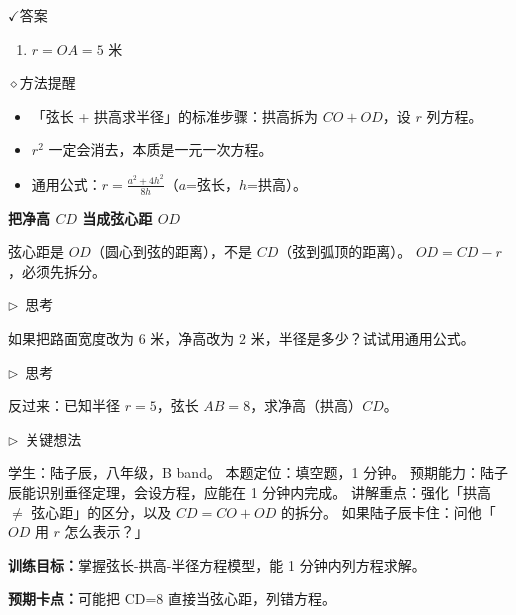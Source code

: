 \documentclass{exam-zh}
\newcommand{\edukai}{\kaishu}
\newcommand{\eduSubTitle}[1]{%
  \needspace{4\baselineskip}%
  \vspace{1mm}
  {\color{edu-blue}\bfseries #1}\par
  \vspace{1mm}
}
\newenvironment{eduAuxItem}[1]{%
  \needspace{4\baselineskip}%
  \vspace{2mm}
  \par\noindent
  \hangindent=8mm\hangafter=1
  {\color{edu-blue}\edukai $\triangleright$~#1}\enspace
  \begingroup
  \color{edu-ink}
  \edukai
}{%
  \endgroup
  \par
  \vspace{4mm}
}
\newcommand{\eduIconCheck}{\(\checkmark\)}
\newcommand{\eduIconPin}{\(\diamond\)}
\newenvironment{eduBulletList}{%
  \begin{itemize}[
    label=\textbullet,
    leftmargin=5mm,
    itemsep=1.2mm,
    topsep=0pt,
    parsep=0pt
  ]
}{%
  \end{itemize}
}
\newenvironment{eduBottomGrid}{%
  \vspace{1mm}
  \par\noindent
}{%
  \par\vspace{1mm}
}
\newenvironment{eduSummaryLeft}{%
  \begin{minipage}[t]{0.30\linewidth}
}{%
  \end{minipage}
}
\newcommand{\eduSummaryDivider}{%
  \hspace{4mm}{\color{edu-line}\vrule width 0.35pt}\hspace{7mm}%
}
\newenvironment{eduSummaryRight}{%
  \begin{minipage}[t]{0.58\linewidth}
}{%
  \end{minipage}
}
\newenvironment{eduPlainList}{%
  \begin{enumerate}[
    label=(\arabic*),
    leftmargin=7mm,
    itemsep=1.2mm,
    topsep=0pt,
    parsep=0pt
  ]
}{%
  \end{enumerate}
}
\begin{document}
\begin{eduBottomGrid}
  \begin{eduSummaryLeft}
    \begin{eduSummaryBlock}{\eduIconCheck}{答案}
    \begin{eduPlainList}
      \item $r = OA = 5$ 米    \end{eduPlainList}
    \end{eduSummaryBlock}
  \end{eduSummaryLeft}
  \eduSummaryDivider
  \begin{eduSummaryRight}
    \begin{eduSummaryBlock}{\eduIconPin}{方法提醒}
    \begin{eduBulletList}
      \item 「弦长 + 拱高求半径」的标准步骤：拱高拆为 $CO+OD$，设 $r$ 列方程。      \item $r^2$ 一定会消去，本质是一元一次方程。      \item 通用公式：$r = \frac{a^2 + 4h^2}{8h}$（$a$=弦长，$h$=拱高）。    \end{eduBulletList}
    \end{eduSummaryBlock}
  \end{eduSummaryRight}
\end{eduBottomGrid}




\begin{eduMistakeBox}
\eduSubTitle{把净高 $CD$ 当成弦心距 $OD$}弦心距是 $OD$（圆心到弦的距离），不是 $CD$（弦到弧顶的距离）。
$OD = CD - r$，必须先拆分。
\end{eduMistakeBox}




\begin{eduAuxItem}{思考}
如果把路面宽度改为 $6$ 米，净高改为 $2$ 米，半径是多少？试试用通用公式。\end{eduAuxItem}




\begin{eduAuxItem}{思考}
反过来：已知半径 $r=5$，弦长 $AB=8$，求净高（拱高）$CD$。\end{eduAuxItem}



\clearpage

\begin{eduAuxItem}{关键想法}
学生：陆子辰，八年级，B band。
本题定位：填空题，1 分钟。
预期能力：陆子辰能识别垂径定理，会设方程，应能在 1 分钟内完成。
讲解重点：强化「拱高 $\neq$ 弦心距」的区分，以及 $CD = CO + OD$ 的拆分。
如果陆子辰卡住：问他「$OD$ 用 $r$ 怎么表示？」
\end{eduAuxItem}


\begin{eduTeacherNote}
  \textbf{训练目标：}掌握弦长-拱高-半径方程模型，能 1 分钟内列方程求解。\par
  \textbf{预期卡点：}可能把 CD=8 直接当弦心距，列错方程。
\end{eduTeacherNote}
\end{document}
